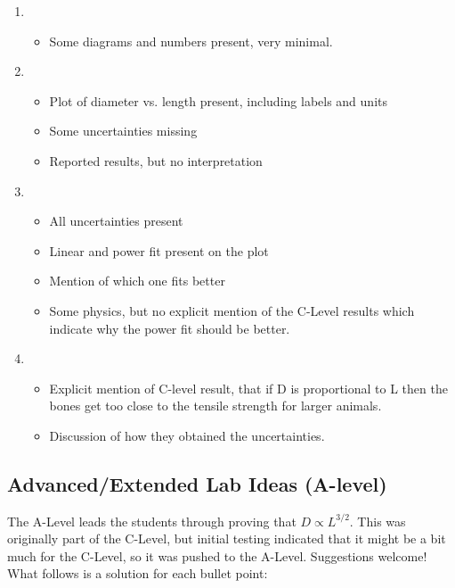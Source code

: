 \documentclass[fleqn,letterpaper]{article}
\begin{document}
\begin{enumerate}
 \item{
  \begin{itemize}
   \item{Some diagrams and numbers present, very minimal.}
  \end{itemize}
}
 \item{
  \begin{itemize}
   \item{Plot of diameter vs. length present, including labels and units}
   \item{Some uncertainties missing}
   \item{Reported results, but no interpretation}
  \end{itemize}
}
 \item{
  \begin{itemize}
   \item{All uncertainties present}
   \item{Linear and power fit present on the plot}
   \item{Mention of which one fits better}
   \item{Some physics, but no explicit mention of the C-Level results which indicate why the power fit should be better.}
  \end{itemize}
}
 \item{
  \begin{itemize}
   \item{Explicit mention of C-level result, that if D is proportional to L then the bones get too close to the tensile strength for larger animals.}
   \item{Discussion of how they obtained the uncertainties.}
  \end{itemize}
}
\end{enumerate}


\subsection*{Advanced/Extended Lab Ideas (A-level)}

The A-Level leads the students through proving that $D \propto L^{3/2}$.  This was originally part of the C-Level, but initial testing indicated that it might be a bit much for the C-Level, so it was pushed to the A-Level.  Suggestions welcome!  What follows is a solution for each bullet point:
\end{document}
